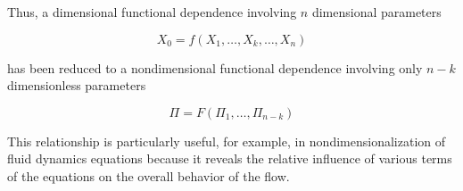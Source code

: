 \documentclass[
10pt, %
a4paper, %
oneside, %
headinclude,footinclude, %
BCOR5mm, %
]{scrartcl}
\begin{document}
Thus, a dimensional functional dependence involving $n$ dimensional parameters

$$X_0 = f(X_1, \hdots, X_k, \hdots, X_n)$$

has been reduced to a nondimensional functional dependence involving only $n-k$ dimensionless parameters

$$ \Pi = F(\Pi_1, \hdots, \Pi_{n-k}) $$

This relationship is particularly useful, for example, in nondimensionalization of fluid dynamics equations because it reveals the relative influence of various terms of the equations on the overall behavior of the flow.





\end{document}
